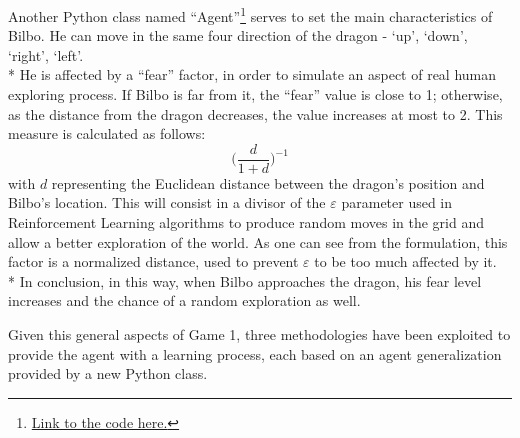 Another Python class named ``Agent''\footnote{\href{https://github.com/moiraghif/DragonHunting/blob/master/Bilbo\%20World/agents.py}{Link to the code here.}} serves to set the main characteristics of Bilbo.
He can move in the same four direction of the dragon - `up', `down', `right', `left'. \\*
He is affected by a ``fear'' factor, in order to simulate an aspect of real human exploring process. If Bilbo is far from it, the ``fear'' value is close to 1; otherwise, as the distance from the dragon decreases, the value increases at most to 2. This measure is calculated as follows: 
$$\Big(\frac{d}{1+d}\Big)^{-1}$$
with $d$ representing the Euclidean distance between the dragon's position and Bilbo's location.
This will consist in a divisor of the $\varepsilon$ parameter used in Reinforcement Learning algorithms to produce random moves in the grid and allow a better exploration of the world. As one can see from the formulation, this factor is a normalized distance, used to prevent $\varepsilon$ to be too much affected by it.\\*
In conclusion, in this way, when Bilbo approaches the dragon, his fear level increases and the chance of a random exploration as well.

Given this general aspects of Game 1, three methodologies have been exploited to provide the agent with a learning process, each based on an agent generalization provided by a new Python class.

